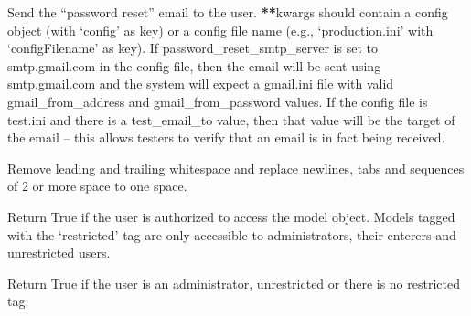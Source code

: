 \documentclass[letterpaper,10pt,english]{sphinxmanual}
\begin{document}

\begin{fulllineitems}
\label{api:old.lib.utils.sendPasswordResetEmailTo}
Send the ``password reset'' email to the user.  {\color{red}\bfseries{}**}kwargs should contain a
config object (with `config' as key) or a config file name (e.g.,
`production.ini' with `configFilename' as key).  If
password\_reset\_smtp\_server is set to smtp.gmail.com in the config file, then
the email will be sent using smtp.gmail.com and the system will expect a
gmail.ini file with valid gmail\_from\_address and gmail\_from\_password values.
If the config file is test.ini and there is a test\_email\_to value, then that
value will be the target of the email -- this allows testers to verify that
an email is in fact being received.

\end{fulllineitems}


\begin{fulllineitems}
\label{api:old.lib.utils.toSingleSpace}
Remove leading and trailing whitespace and replace newlines, tabs and
sequences of 2 or more space to one space.

\end{fulllineitems}


\begin{fulllineitems}
\label{api:old.lib.utils.userIsAuthorizedToAccessModel}
Return True if the user is authorized to access the model object.  Models
tagged with the `restricted' tag are only accessible to administrators, their
enterers and unrestricted users.

\end{fulllineitems}


\begin{fulllineitems}
\label{api:old.lib.utils.userIsUnrestricted}
Return True if the user is an administrator, unrestricted or there is no
restricted tag.

\end{fulllineitems}
\end{document}
